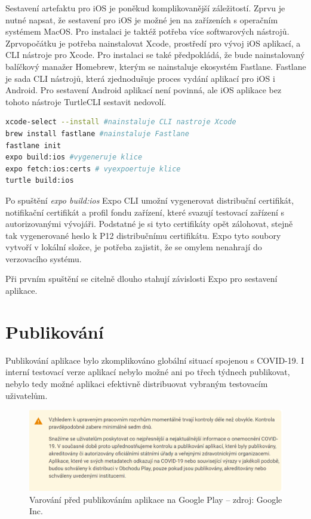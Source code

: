 Sestavení artefaktu pro iOS je poněkud komplikovanější záležitostí. Zprvu je nutné napsat, že sestavení pro iOS je možné jen na zařízeních s operačním systémem MacOS. Pro instalaci je taktéž potřeba více softwarových nástrojů. Zprvopočátku je potřeba nainstalovat Xcode, prostředí pro vývoj iOS aplikací, a CLI nástroje pro Xcode. Pro instalaci se také předpokládá, že bude nainstalovaný balíčkový manažer Homebrew, kterým se nainstaluje ekosystém Fastlane. Fastlane je sada CLI nástrojů, která zjednodušuje proces vydání aplikací pro iOS i Android. Pro sestavení Android aplikací není povinná, ale iOS aplikace bez tohoto nástroje TurtleCLI sestavit nedovolí.

\begin{lstlisting}[language=Bash, caption=Sestavení na Android]
xcode-select --install #nainstaluje CLI nastroje Xcode 
brew install fastlane #nainstaluje Fastlane
fastlane init
expo build:ios #vygeneruje klice
expo fetch:ios:certs # vyexpoertuje klice 
turtle build:ios
\end{lstlisting}

Po spuštění \emph{expo build:ios} Expo CLI umožní vygenerovat distribuční certifikát, notifikační certifikát a profil fondu zařízení, které svazují testovací zařízení s autorizovanými vývojáři. Podstatné je si tyto certifikáty opět zálohovat, stejně tak vygenerované heslo k P12 distribučnímu certifikátu. Expo tyto soubory vytvoří v lokální složce, je potřeba zajistit, že se omylem nenahrají do verzovacího systému.

Při prvním spuštění se citelně dlouho stahují závislosti Expo pro sestavení aplikace.

\section{Publikování}

Publikování aplikace bylo zkomplikováno globální situací spojenou s COVID-19. I interní testovací verze aplikací nebylo možné ani po třech týdnech publikovat, nebylo tedy možné aplikaci efektivně distribuovat vybraným testovacím uživatelům.

\begin{figure}[H]
	\begin{center}
		\includegraphics[width=140mm]{img/covid19.png}
	\end{center}
	\caption[Varování před publikováním aplikace na Google Play]{Varování před publikováním aplikace na Google Play -- zdroj: Google Inc.}
\end{figure}

